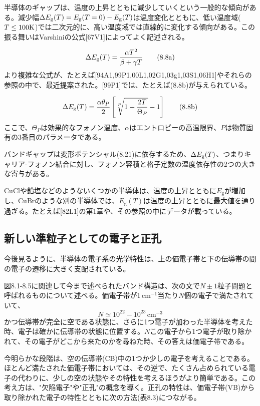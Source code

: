 \documentclass[11pt,a4j,uplatex]{jsarticle}
\begin{document}
半導体のギャップは、温度の上昇とともに減少していくという一般的な傾向がある。減少幅$\Delta E_{\rm{g}}(T)=E_{\rm{g}}(T=0)-E_{\rm{g}}(T)$は温度変化とともに、低い温度域($T\leq100\rm{K}$)では二次元的に、高い温度域では直線的に変化する傾向がある。この振る舞いはVarshiniの公式[67V1]によってよく記述される。

\begin{equation}
  \Delta E_{\rm{g}}(T)=\frac{\alpha T^2}{\beta+\gamma T}
  \tag{8.8a}
\end{equation}
より複雑な公式が、たとえば[94A1,99P1,00L1,02G1,03g1,03S1,06H1]やそれらの参照の中で、最近提案された。[99P1]では、たとえば(8.8b)が与えられている。

\begin{equation}
  \Delta E_{\rm{g}}(T)=\frac{\alpha\theta_P}{2}\left[\sqrt[P]{1+\frac{2T}{\Theta_P}}-1\right]
  \tag{8.8b}
\end{equation}
ここで、$\Theta_P$は効果的なフォノン温度、$\alpha$はエントロピーの高温限界、$P$は物質固有の3番目のパラメータである。

バンドギャップは変形ポテンシャル(8.21)に依存するため、$\Delta E_{\rm{g}}(T)$、つまりキャリア-フォノン結合に対し、フォノン容積と格子定数の温度依存性の2つの大きな寄与がある。

CuClや鉛塩などのようないくつかの半導体は、温度の上昇とともに$E_\mathrm{g}$が増加し、CuBrのような別の半導体では、$E_\mathrm{g}(T)$は温度の上昇とともに最大値を通り過ぎる。たとえば[82L1]の第1章や、その参照の中にデータが載っている。

  \subsection{新しい準粒子としての電子と正孔}

今後見るように、半導体の電子系の光学特性は、上の価電子帯と下の伝導帯の間の電子の遷移に大きく支配されている。

図8.1-8.5に関連して今まで述べられたバンド構造は、次の文で$N\pm1$粒子問題と呼ばれるものについて述べる。価電子帯が$1\,\mathrm{cm}^{-1}$当たり$N$個の電子で満たされていて、
\begin{equation}
  N\simeq10^{22}-10^{23}\,\mathrm{cm}^{-3}
  \tag{8.9}
\end{equation}
かつ伝導帯が完全に空である状態に、さらに1つ電子が加わった半導体を考えた時、電子は確かに伝導帯の状態に位置する。$N$この電子から1つ電子が取り除かれて、その電子がどこから来たのかを尋ねた時、その答えは価電子帯である。

今明らかな段階は、空の伝導帯(CB)中の1つか少しの電子を考えることである。ほとんど満たされた価電子帯においては、その逆で、たくさん占められている電子の代わりに、少しの空の状態やその特性を考えるほうがより簡単である。この考え方は、"欠陥電子"や"正孔"の概念を導く。正孔の特性は、価電子帯(VB)から取り除かれた電子の特性とともに次の方法(表8.3)につながる。
\end{document}
